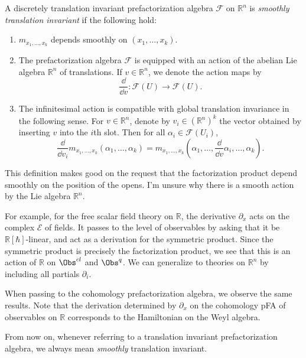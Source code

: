 \begin{definition}\label{dfn:smooth-trans-inv}
	A discretely translation invariant prefactorization algebra $\mathcal{F} $ on $\mathbb{R} ^n$ is \emph{smoothly translation invariant} if the following hold:
	\begin{enumerate}
		\item $m_{x_1, \ldots , x_k} $ depends smoothly on $(x_1, \ldots , x_k)$.
		\item The prefactorization algebra $\mathcal{F} $ is equipped with an action of the abelian Lie algebra $\mathbb{R} ^n$ of translations. If $v\in\mathbb{R} ^n$, we denote the action maps by
		\[
			\frac{\dd }{\dd v}: \mathcal{F} (U) \to \mathcal{F} (U)
		.\]
	\item The infinitesimal action is compatible with global translation invariance in the following sense. For $v\in\mathbb{R} ^n$, denote by $v_i\in(\mathbb{R} ^n)^k$ the vector obtained by inserting $v$ into the $i$th slot. Then for all $\alpha _i\in \mathcal{F} (U_i)$,
	\[
		\frac{\dd }{\dd v_i}m_{x_1, \ldots ,x_k} (\alpha _1, \ldots ,\alpha _k) = m_{x_1, \ldots ,x_k} \left( \alpha_1, \ldots , \frac{\dd }{\dd v}\alpha _i, \ldots , \alpha _k \right) 
	.\]
	\end{enumerate}
\end{definition}

This definition makes good on the request that the factorization product depend smoothly on the position of the opens. I'm unsure why there is a smooth action by the Lie algebra $\mathbb{R} ^n$.

For example, for the free scalar field theory on $\mathbb{R} $, the derivative $\partial _x$ acts on the complex $\mathcal{E} $ of fields. It passes to the level of observables by asking that it be $\mathbb{R} [\hbar ]$-linear, and act as a derivation for the symmetric product. Since the symmetric product is precisely the factorization product, we see that this is an action of $\mathbb{R} $ on $\Obs^{cl} $ and $\Obs^{q} $. We can generalize to theories on $\mathbb{R} ^n$ by including all partials $\partial _i$.

When passing to the cohomology prefactorization algebra, we observe the same results. Note that the derivation determined by $\partial _x$ on the cohomology pFA of observables on $\mathbb{R} $ corresponds to the Hamiltonian on the Weyl algebra.

From now on, whenever referring to a translation invariant prefactorization algebra, we always mean \emph{smoothly} translation invariant.

